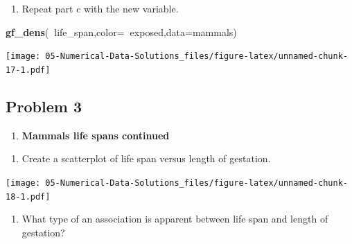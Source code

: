 \documentclass[
]{book}
\newenvironment{Shaded}{\begin{snugshade}}{\end{snugshade}}
\newcommand{\DataTypeTok}[1]{\textcolor[rgb]{0.13,0.29,0.53}{#1}}
\newcommand{\KeywordTok}[1]{\textcolor[rgb]{0.13,0.29,0.53}{\textbf{#1}}}
\newcommand{\NormalTok}[1]{#1}
\newcommand{\OperatorTok}[1]{\textcolor[rgb]{0.81,0.36,0.00}{\textbf{#1}}}
\providecommand{\tightlist}{%
  \setlength{\itemsep}{0pt}\setlength{\parskip}{0pt}}
\begin{document}
\begin{enumerate}
\def\labelenumi{\alph{enumi}.}
\setcounter{enumi}{4}
\tightlist
\item
  Repeat part c with the new variable.
\end{enumerate}

\begin{Shaded}
\begin{Highlighting}[]
\KeywordTok{gf_dens}\NormalTok{(}\OperatorTok{~}\NormalTok{life_span,}\DataTypeTok{color=}\OperatorTok{~}\NormalTok{exposed,}\DataTypeTok{data=}\NormalTok{mammals)}
\end{Highlighting}
\end{Shaded}

\texttt{[image: 05-Numerical-Data-Solutions\_files/figure-latex/unnamed-chunk-17-1.pdf]}

\hypertarget{problem-3-2}{%
\subsection{Problem 3}\label{problem-3-2}}

\begin{enumerate}
\def\labelenumi{\arabic{enumi}.}
\setcounter{enumi}{2}
\tightlist
\item
  \textbf{Mammals life spans continued}
\end{enumerate}

\begin{enumerate}
\def\labelenumi{\alph{enumi}.}
\tightlist
\item
  Create a scatterplot of life span versus length of gestation.
\end{enumerate}

\begin{Shaded}
\end{Shaded}

\texttt{[image: 05-Numerical-Data-Solutions\_files/figure-latex/unnamed-chunk-18-1.pdf]}

\begin{enumerate}
\def\labelenumi{\alph{enumi}.}
\setcounter{enumi}{1}
\tightlist
\item
  What type of an association is apparent between life span and length of gestation?
\end{enumerate}
\end{document}

